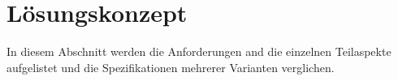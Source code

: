 \section{Lösungskonzept}
\label{sec:Loesungskonzept}

In diesem Abschnitt werden die Anforderungen and die einzelnen Teilaspekte aufgelistet und die Spezifikationen mehrerer Varianten verglichen.


